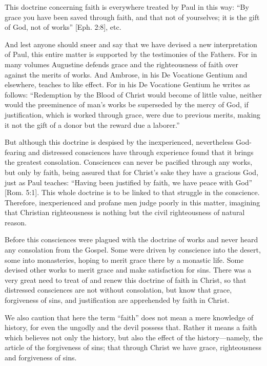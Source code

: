 This doctrine concerning faith is everywhere treated by Paul in this way: “By grace you have been saved through faith, and that not of yourselves; it is the gift of God, not of works” [Eph. 2:8], etc.

And lest anyone should sneer and say that we have devised a new interpretation of Paul, this entire matter is supported by the testimonies of the Fathers. For in many volumes Augustine defends grace and the righteousness of faith over against the merits of works. And Ambrose, in his De Vocatione Gentium and elsewhere, teaches to like effect. For in his De Vocatione Gentium he writes as follows: “Redemption by the Blood of Christ would become of little value, neither would the preeminence of man’s works be superseded by the mercy of God, if justification, which is worked through grace, were due to previous merits, making it not the gift of a donor but the reward due a laborer.”

But although this doctrine is despised by the inexperienced, nevertheless God-fearing and distressed consciences have through experience found that it brings the greatest consolation. Consciences can never be pacified through any works, but only by faith, being assured that for Christ’s sake they have a gracious God, just as Paul teaches: “Having been justified by faith, we have peace with God” [Rom. 5:1]. This whole doctrine is to be linked to that struggle in the conscience. Therefore, inexperienced and profane men judge poorly in this matter, imagining that Christian righteousness is nothing but the civil righteousness of natural reason.

Before this consciences were plagued with the doctrine of works and never heard any consolation from the Gospel. Some were driven by conscience into the desert, some into monasteries, hoping to merit grace there by a monastic life. Some devised other works to merit grace and make satisfaction for sins. There was a very great need to treat of and renew this doctrine of faith in Christ, so that distressed consciences are not without consolation, but know that grace, forgiveness of sins, and justification are apprehended by faith in Christ.

We also caution that here the term “faith” does not mean a mere knowledge of history, for even the ungodly and the devil possess that. Rather it means a faith which believes not only the history, but also the effect of the history—namely, the article of the forgiveness of sins; that through Christ we have grace, righteousness and forgiveness of sins.

